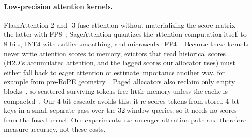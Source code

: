 \paragraph{Low-precision attention kernels.}
FlashAttention-2 and -3 fuse attention without materializing the score
matrix, the latter with FP8~\citep{dao2023flashattention2,shah2024flashattention3};
SageAttention quantizes the attention computation itself to 8 bits, INT4 with
outlier smoothing, and microscaled FP4~\citep{zhang2024sageattention,zhang2024sageattention2,zhang2025sageattention3}.
Because these kernels never write attention scores to memory, evictors that
read historical scores (H2O's accumulated attention, and the lagged scores our
allocator uses) must either fall back to eager attention or estimate
importance another way, for example from pre-RoPE geometry~\citep{mao2026triattention}.
Paged allocators also reclaim only empty blocks~\citep{kwon2023vllm}, so
scattered surviving tokens free little memory unless the cache is
compacted~\citep{mao2026triattention}.
Our 4-bit cascade avoids this: it re-scores tokens from stored 4-bit keys in a
small separate pass over the 32 window queries, so it needs no scores from the
fused kernel.
Our experiments use an eager attention path and therefore measure accuracy,
not these costs.
